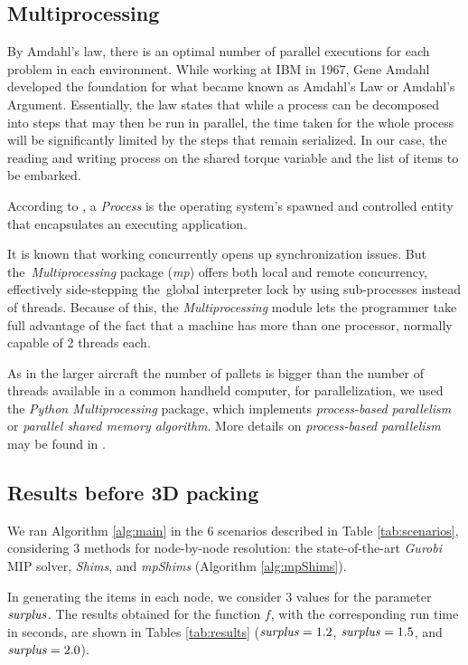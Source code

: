 \documentclass[preprint,authoryear]{elsarticle}
\begin{document}
\subsection{Multiprocessing}

By Amdahl's law, there is an optimal number of parallel executions for each problem in each environment. While working at IBM in 1967, Gene Amdahl developed the foundation for what became known as Amdahl's Law or Amdahl's Argument. Essentially, the law states that while a process can be decomposed into steps that may then be run in parallel, the time taken for the whole process will be significantly limited by the steps that remain serialized. In our case, the reading and writing process on the shared torque variable and the list of items to be embarked.

According to \cite[p.271]{Breshears2009}, a {\it Process} is the operating system’s spawned and controlled entity that encapsulates an executing application.

It is known that working concurrently opens up synchronization issues. But the {\it Multiprocessing} package ({\it mp}) offers both local and remote concurrency, effectively side-stepping the global interpreter lock by using sub-processes instead of threads. Because of this, the {\it Multiprocessing} module lets the programmer take full advantage of the fact that a machine has more than one processor, normally capable of 2 threads each.

As in the larger aircraft the number of pallets is bigger than the number of threads available in a common handheld computer, for parallelization, we used the {\it Python Multiprocessing} package, which implements {\it process-based parallelism} or {\it parallel shared memory algorithm}. More details on {\it process-based parallelism} may be found in  \cite{multiprocessing}.


\subsection{Results {\bf before} 3D packing}

We ran Algorithm \ref{alg:main} in the 6 scenarios described in Table \ref{tab:scenarios}, considering 3 methods for node-by-node resolution: the state-of-the-art {\it Gurobi} MIP solver, {\it Shims}, and {\it mpShims} (Algorithm \ref{alg:mpShims}).

In generating the items in each node, we consider 3 values for the parameter ${\it surplus}$. The results obtained for the function $f$, with the corresponding run time in seconds, are shown in Tables \ref{tab:results} (${\it surplus} = 1.2$, ${\it surplus} = 1.5$, and ${\it surplus} = 2.0$).
\end{document}
